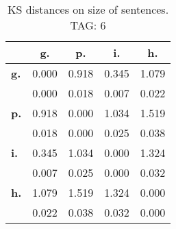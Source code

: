 \begin{table}[h!]
\begin{center}
\begin{tabular}{| l || c | c | c | c |}\hline
 & {\bf g.} & {\bf p.} & {\bf i.} & {\bf h.} \\\hline\hline
{\bf g.} & 0.000 & 0.918 & 0.345 & 1.079 \\
{\bf } & 0.000 & 0.018 & 0.007 & 0.022 \\\hline
{\bf p.} & 0.918 & 0.000 & 1.034 & 1.519 \\
{\bf } & 0.018 & 0.000 & 0.025 & 0.038 \\\hline
{\bf i.} & 0.345 & 1.034 & 0.000 & 1.324 \\
{\bf } & 0.007 & 0.025 & 0.000 & 0.032 \\\hline
{\bf h.} & 1.079 & 1.519 & 1.324 & 0.000 \\
{\bf } & 0.022 & 0.038 & 0.032 & 0.000 \\\hline
\end{tabular}
\caption{KS distances on size of sentences. TAG: 6}
\end{center}
\end{table}